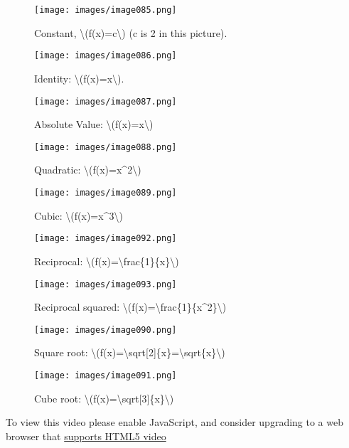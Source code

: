 \begin{figure}
\centering
\texttt{[image: images/image085.png]}
\caption{Constant, \textbackslash{}(f(x)=c\textbackslash{}) (c is 2 in
this picture).}
\end{figure}

\begin{figure}
\centering
\texttt{[image: images/image086.png]}
\caption{Identity: \textbackslash{}(f(x)=x\textbackslash{}).}
\end{figure}

\begin{figure}
\centering
\texttt{[image: images/image087.png]}
\caption{Absolute Value:
\textbackslash{}(f(x)=\textbar{}x\textbar{}\textbackslash{})}
\end{figure}

\begin{figure}
\centering
\texttt{[image: images/image088.png]}
\caption{Quadratic: \textbackslash{}(f(x)=x\^{}2\textbackslash{})}
\end{figure}

\begin{figure}
\centering
\texttt{[image: images/image089.png]}
\caption{Cubic: \textbackslash{}(f(x)=x\^{}3\textbackslash{})}
\end{figure}

\begin{figure}
\centering
\texttt{[image: images/image092.png]}
\caption{Reciprocal:
\textbackslash{}(f(x)=\textbackslash{}frac\{1\}\{x\}\textbackslash{})}
\end{figure}

\begin{figure}
\centering
\texttt{[image: images/image093.png]}
\caption{Reciprocal squared:
\textbackslash{}(f(x)=\textbackslash{}frac\{1\}\{x\^{}2\}\textbackslash{})}
\end{figure}

\begin{figure}
\centering
\texttt{[image: images/image090.png]}
\caption{Square root:
\textbackslash{}(f(x)=\textbackslash{}sqrt{[}2{]}\{x\}=\textbackslash{}sqrt\{x\}\textbackslash{})}
\end{figure}

\begin{figure}
\centering
\texttt{[image: images/image091.png]}
\caption{Cube root:
\textbackslash{}(f(x)=\textbackslash{}sqrt{[}3{]}\{x\}\textbackslash{})}
\end{figure}

To view this video please enable JavaScript, and consider upgrading to a
web browser that \href{http://videojs.com/html5-video-support/}{supports
HTML5 video}

